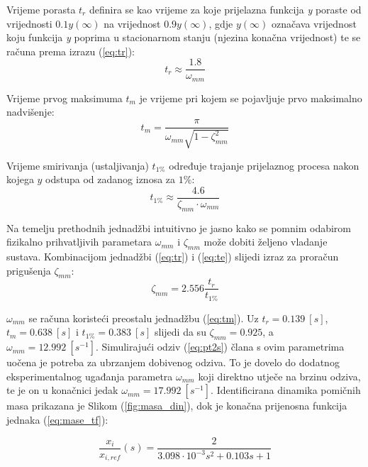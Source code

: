 \documentclass[11pt,a4paper]{article}
\begin{document}
\medskip

Vrijeme porasta $t_{r}$ definira se kao vrijeme za koje prijelazna funkcija \textit{y} poraste od vrijednosti $0.1y(\infty)$ na vrijednost $0.9y(\infty)$, gdje $y(\infty)$ označava vrijednost koju funkcija \textit{y} poprima u stacionarnom stanju (njezina konačna vrijednost) te se računa prema izrazu (\ref{eq:tr}):
\begin{equation}
t_{r} \approx \frac{1.8}{\omega_{mm}}
\label{eq:tr}
\end{equation}


Vrijeme prvog maksimuma $t_{m}$ je vrijeme pri kojem se pojavljuje prvo maksimalno nadvišenje:
\begin{equation}
t_{m} = \frac{\pi}{\omega_{mm}\sqrt{1 - \zeta_{mm}^{2}}}
\label{eq:tm}
\end{equation}

Vrijeme smirivanja (ustaljivanja) $t_{1\%}$ određuje trajanje prijelaznog procesa nakon kojega $y$ odstupa od zadanog iznosa za $1\%$:
\begin{equation}
t_{1\%} \approx \frac{4.6}{\zeta_{mm} \cdot \omega_{mm}}
\label{eq:te}
\end{equation}

Na temelju prethodnih jednadžbi intuitivno je jasno kako se pomnim odabirom fizikalno prihvatljivih parametara $\omega_{mm}$ i $\zeta_{mm}$ može dobiti željeno vladanje sustava. Kombinacijom jednadžbi (\ref{eq:tr}) i (\ref{eq:te}) slijedi izraz za proračun prigušenja $\zeta_{mm}$:
\begin{equation}
\zeta_{mm} = 2.556 \frac{t_{r}}{t_{1\%}}
\label{eq:zeta}
\end{equation}

$\omega_{mm}$ se računa koristeći preostalu jednadžbu (\ref{eq:tm}). Uz $t_{r} = 0.139 \ [s]$, $t_{m} = 0.638 \ [s]$ i $t_{1\%} = 0.383 \ [s]$ slijedi da su $\zeta_{mm} = 0.925$, a $\omega_{mm} = 12.992 \ [s^{-1}]$. Simulirajući odziv (\ref{eq:pt2s}) člana s ovim parametrima uočena je potreba za ubrzanjem dobivenog odziva. To je dovelo do dodatnog eksperimentalnog ugađanja parametra $\omega_{mm}$ koji direktno utječe na brzinu odziva, te je on u konačnici jedak $\omega_{mm} = 17.992 \ [s^{-1}]$. Identificirana dinamika pomičnih masa prikazana je Slikom (\ref{fig:masa_din}), dok je konačna prijenosna funkcija jednaka (\ref{eq:mase_tf}):

\begin{equation}
\boxed{
\frac{x_{i}}{x_{i, ref}}(s) = \frac{2}{3.098\cdot10^{-3}s^{2} + 0.103 s + 1}
}
\label{eq:mase_tf}
\end{equation}
\end{document}
